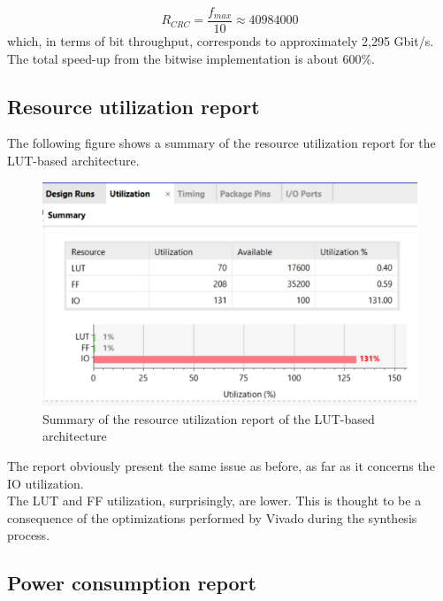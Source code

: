 \begin{equation}\label{eq:CRC_per_second}
R_{CRC} = \frac{f_{max}}{10} \approx 40984000
\end{equation}
\hfill \break
which, in terms of bit throughput, corresponds to approximately 2,295 Gbit/s.\\
The total speed-up from the bitwise implementation is about 600\%.

\subsection{Resource utilization report}

The following figure shows a summary of the resource utilization report for the LUT-based architecture.

\begin{figure}[H]
    \begin{center}
        \includegraphics[scale=.75,clip]{img/vivado_lut_resources.png}
    \end{center}
    \vspace*{-0.5cm}
    \caption{Summary of the resource utilization report of the LUT-based architecture}
    \label{fig:vivado_bit_resources}
\end{figure}
\hfill \break
The report obviously present the same issue as before, as far as it concerns the IO utilization.\\
The LUT and FF utilization, surprisingly, are lower. This is thought to be a consequence of the optimizations performed by Vivado during the synthesis process.

\subsection{Power consumption report}

